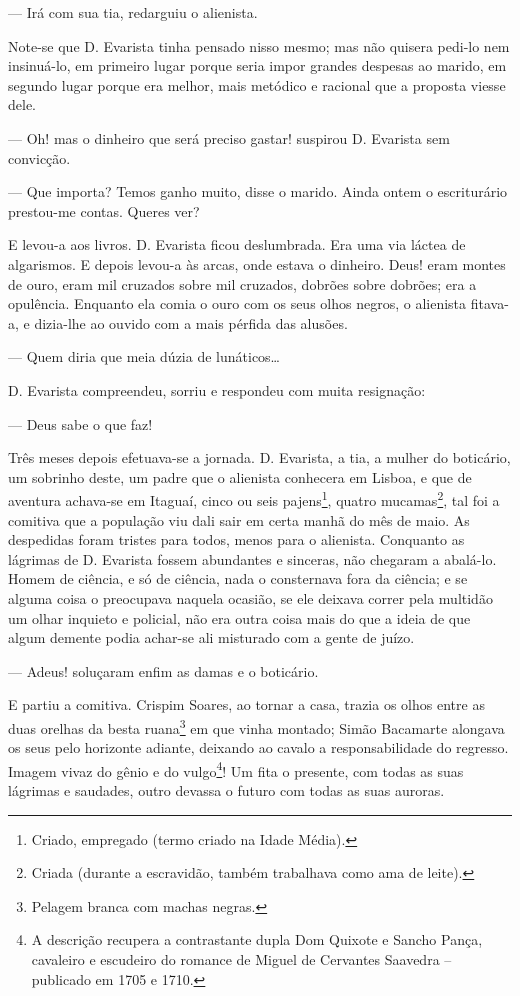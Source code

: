 --- Irá com sua tia, redarguiu o alienista.

Note-se que D. Evarista tinha pensado nisso mesmo; mas não quisera
pedi-lo nem insinuá-lo, em primeiro lugar porque seria impor grandes
despesas ao marido, em segundo lugar porque era melhor, mais metódico e
racional que a proposta viesse dele.

--- Oh! mas o dinheiro que será preciso gastar! suspirou D. Evarista sem
convicção.

--- Que importa? Temos ganho muito, disse o marido. Ainda ontem o
escriturário prestou-me contas. Queres ver?

E levou-a aos livros. D. Evarista ficou deslumbrada. Era uma via láctea
de algarismos. E depois levou-a às arcas, onde estava o dinheiro. Deus!
eram montes de ouro, eram mil cruzados sobre mil cruzados, dobrões sobre
dobrões; era a opulência. Enquanto ela comia o ouro com os seus olhos
negros, o alienista fitava-a, e dizia-lhe ao ouvido com a mais pérfida
das alusões.

--- Quem diria que meia dúzia de lunáticos\ldots{}

D. Evarista compreendeu, sorriu e respondeu com muita resignação:

--- Deus sabe o que faz!

Três meses depois efetuava-se a jornada. D. Evarista, a tia, a mulher do
boticário, um sobrinho deste, um padre que o alienista conhecera em
Lisboa, e que de aventura achava-se em Itaguaí, cinco ou seis
pajens\footnote{Criado, empregado (termo criado na Idade Média).},
quatro mucamas\footnote{Criada (durante a escravidão, também trabalhava
  como ama de leite).}, tal foi a comitiva que a população viu dali sair
em certa manhã do mês de maio. As despedidas foram tristes para todos,
menos para o alienista. Conquanto as lágrimas de D. Evarista fossem
abundantes e sinceras, não chegaram a abalá-lo. Homem de ciência, e só
de ciência, nada o consternava fora da ciência; e se alguma coisa o
preocupava naquela ocasião, se ele deixava correr pela multidão um olhar
inquieto e policial, não era outra coisa mais do que a ideia de que
algum demente podia achar-se ali misturado com a gente de juízo.

--- Adeus! soluçaram enfim as damas e o boticário.

E partiu a comitiva. Crispim Soares, ao tornar a casa, trazia os olhos
entre as duas orelhas da besta ruana\footnote{Pelagem branca com machas
  negras.} em que vinha montado; Simão Bacamarte alongava os seus pelo
horizonte adiante, deixando ao cavalo a responsabilidade do regresso.
Imagem vivaz do gênio e do vulgo\footnote{A descrição recupera a
  contrastante dupla Dom Quixote e Sancho Pança, cavaleiro e escudeiro
  do romance de Miguel de Cervantes Saavedra -- publicado em 1705 e
  1710.}! Um fita o presente, com todas as suas lágrimas e saudades,
outro devassa o futuro com todas as suas auroras.

